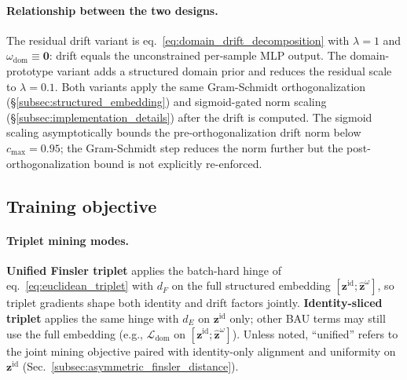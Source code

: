 \paragraph{Relationship between the two designs.}
The residual drift variant is eq.~\eqref{eq:domain_drift_decomposition} with $\lambda{=}1$ and $\omega_{\mathrm{dom}}\equiv\mathbf{0}$: drift equals the unconstrained per-sample MLP output. The domain-prototype variant adds a structured domain prior and reduces the residual scale to $\lambda{=}0.1$. Both variants apply the same Gram-Schmidt orthogonalization (\S\ref{subsec:structured_embedding}) and sigmoid-gated norm scaling (\S\ref{subsec:implementation_details}) after the drift is computed. The sigmoid scaling asymptotically bounds the pre-orthogonalization drift norm below $c_{\max}{=}0.95$; the Gram-Schmidt step reduces the norm further but the post-orthogonalization bound is not explicitly re-enforced.

\subsection{Training objective} \label{subsec:training_objective}
\label{subsec:unified_vs_identity_sliced}\label{subsec:total_objective}%

\paragraph{Triplet mining modes.}
\textbf{Unified Finsler triplet} applies the batch-hard hinge of eq.~\eqref{eq:euclidean_triplet} with $d_F$ on the full structured embedding $[\mathbf{z}^{\mathrm{id}};\hat{\mathbf{z}}^{\omega}]$, so triplet gradients shape both identity and drift factors jointly. \textbf{Identity-sliced triplet} applies the same hinge with $d_E$ on $\mathbf{z}^{\mathrm{id}}$ only; other BAU terms may still use the full embedding (e.g., $\mathcal{L}_{\mathrm{dom}}$ on $[\mathbf{z}^{\mathrm{id}};\hat{\mathbf{z}}^{\omega}]$). Unless noted, ``unified'' refers to the joint mining objective paired with identity-only alignment and uniformity on $\mathbf{z}^{\mathrm{id}}$ (Sec.~\ref{subsec:asymmetric_finsler_distance}).


